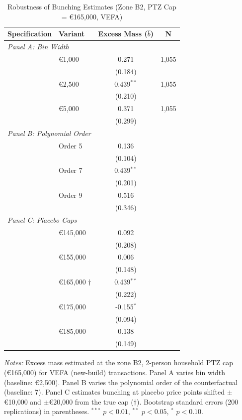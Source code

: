 \begin{table}[H]
\centering
\caption{Robustness of Bunching Estimates (Zone B2, PTZ Cap = \euro165,000, VEFA)}
\label{tab:robust}
\begin{threeparttable}
\begin{tabular}{llcc}
\toprule
Specification & Variant & Excess Mass ($\hat{b}$) & N \\
\midrule
\multicolumn{4}{l}{\textit{Panel A: Bin Width}} \\[3pt]
  & \euro1,000 & 0.271 & 1,055 \\
  & & (0.184) & \\
  & \euro2,500 & 0.439$^{**}$ & 1,055 \\
  & & (0.210) & \\
  & \euro5,000 & 0.371 & 1,055 \\
  & & (0.299) & \\
\midrule
\multicolumn{4}{l}{\textit{Panel B: Polynomial Order}} \\[3pt]
  & Order 5 & 0.136 & \\
  & & (0.104) & \\
  & Order 7 & 0.439$^{**}$ & \\
  & & (0.201) & \\
  & Order 9 & 0.516 & \\
  & & (0.346) & \\
\midrule
\multicolumn{4}{l}{\textit{Panel C: Placebo Caps}} \\[3pt]
  & \euro145,000 & 0.092 & \\
  & & (0.208) & \\
  & \euro155,000 & 0.006 & \\
  & & (0.148) & \\
  & \euro165,000 $\dagger$ & 0.439$^{**}$ & \\
  & & (0.222) & \\
  & \euro175,000 & -0.155$^{*}$ & \\
  & & (0.094) & \\
  & \euro185,000 & 0.138 & \\
  & & (0.149) & \\
\bottomrule
\end{tabular}
\begin{tablenotes}[flushleft]
\small
\item \textit{Notes:} Excess mass estimated at the zone B2, 2-person household PTZ cap (\euro165,000) for VEFA (new-build) transactions. Panel A varies bin width (baseline: \euro2,500). Panel B varies the polynomial order of the counterfactual (baseline: 7). Panel C estimates bunching at placebo price points shifted $\pm$\euro10,000 and $\pm$\euro20,000 from the true cap ($\dagger$). Bootstrap standard errors (200 replications) in parentheses. $^{***}$ $p<0.01$, $^{**}$ $p<0.05$, $^{*}$ $p<0.10$.
\end{tablenotes}
\end{threeparttable}
\end{table}
